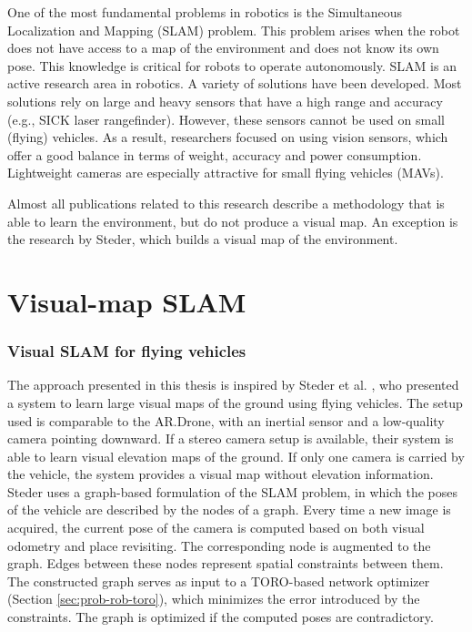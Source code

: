 One of the most fundamental problems in robotics is the Simultaneous Localization and Mapping (SLAM) problem.
This problem arises when the robot does not have access to a map of the environment and does not know its own pose. 
This knowledge is critical for robots to operate autonomously.
SLAM is an active research area in robotics.
A variety of solutions have been developed.
Most solutions rely on large and heavy sensors that have a high range and accuracy (e.g., SICK laser rangefinder).
However, these sensors cannot be used on small (flying) vehicles.
As a result, researchers focused on using vision sensors, which offer a good balance in terms of weight, accuracy and power consumption.
Lightweight cameras are especially attractive for small flying vehicles (MAVs).

Almost all publications related to this research describe a methodology that is able to learn the environment, but do not produce a visual map.
An exception is the research by Steder, which builds a visual map of the environment.


\section{Visual-map SLAM}

\subsubsection{Visual SLAM for flying vehicles}
\label{sec:realted-visual-slam-steder}
The approach presented in this thesis is inspired by Steder et al. \cite{steder2008visual}, who presented a system to learn large visual maps of the ground using flying vehicles.
The setup used is comparable to the AR.Drone, with an inertial sensor and a low-quality camera pointing downward.
If a stereo camera setup is available, their system is able to learn visual elevation maps of the ground.
If only one camera is carried by the vehicle, the system provides a visual map without elevation information.
Steder uses a graph-based formulation of the SLAM problem, in which the poses of the vehicle are described by the nodes of a graph.
Every time a new image is acquired, the current pose of the camera is computed based on both visual odometry and place revisiting.
The corresponding node is augmented to the graph.
Edges between these nodes represent spatial constraints between them.
The constructed graph serves as input to a TORO-based network optimizer (Section \ref{sec:prob-rob-toro}), which minimizes the error introduced by the constraints.
The graph is optimized if the computed poses are contradictory.

